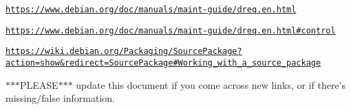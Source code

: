 \href{https://www.debian.org/doc/manuals/maint-guide/dreq.en.html}{\tt https\-://www.\-debian.\-org/doc/manuals/maint-\/guide/dreq.\-en.\-html}

\href{https://www.debian.org/doc/manuals/maint-guide/dreq.en.html#control}{\tt https\-://www.\-debian.\-org/doc/manuals/maint-\/guide/dreq.\-en.\-html\#control}

\href{https://wiki.debian.org/Packaging/SourcePackage?action=show&redirect=SourcePackage#Working_with_a_source_package}{\tt https\-://wiki.\-debian.\-org/\-Packaging/\-Source\-Package?action=show\&redirect=\-Source\-Package\#\-Working\-\_\-with\-\_\-a\-\_\-source\-\_\-package}

$\ast$$\ast$$\ast$\-P\-L\-E\-A\-S\-E$\ast$$\ast$$\ast$ update this document if you come across new links, or if there's missing/false information. 